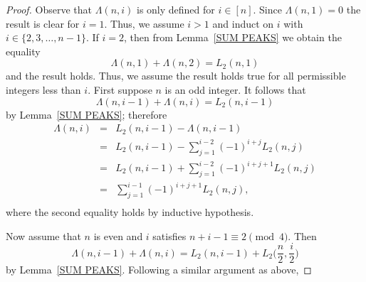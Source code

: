 \documentclass[12pt]{article}
\theoremstyle{plain}
\theoremstyle{definition}
\begin{document}
\begin{proof}
Observe that $\Lambda(n,i)$ is only defined for $i \in [n]$.  Since $\Lambda(n,1)=0$ the result is clear for $i =1$. Thus, we assume $i >1$ and induct on $i$ with $i \in \{2,3, \ldots, n-1\}$.  If $i=2$, then from Lemma~\ref{SUM PEAKS} we obtain the equality
	\[\Lambda(n,1)+\Lambda(n,2)=L_2(n,1)\]
and the result holds.  Thus, we assume the result holds true for all permissible integers less than $i$.  First suppose $n$ is an odd integer.  It follows that 
	\[\Lambda(n,i-1)+\Lambda(n,i)=L_2(n,i-1)\]
by Lemma~\ref{SUM PEAKS}; therefore 
	\begin{eqnarray*}
		\Lambda(n,i) & = & L_2(n,i-1)-\Lambda(n,i-1)\\
			& = & L_2(n,i-1)-\sum_{j=1}^{i-2}(-1)^{i+j} L_2(n,j)\\ 
			& = & L_2(n,i-1)+\sum_{j=1}^{i-2}(-1)^{i+j+1} L_2(n,j)\\ 
			& = & \sum_{j=1}^{i-1}(-1)^{i+j+1} L_2(n,j),\\ 
	\end{eqnarray*}
where the second equality holds by inductive hypothesis. 

Now assume that $n$ is even and $i$ satisfies $n+i-1 \equiv 2 \!\pmod 4$. Then 
		\[\Lambda(n,i-1)+\Lambda(n,i)=L_2(n,i-1) + L_2\bigg(\frac{n}{2}, \frac{i}{2}\bigg)\]
by Lemma~\ref{SUM PEAKS}.
Following a similar argument as above, 


\end{proof}
\end{document}

